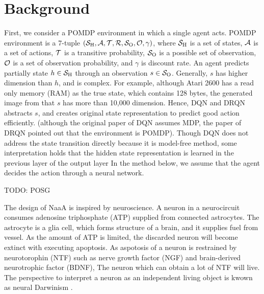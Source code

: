 \section{Background}
First, we consider a POMDP environment in which a single agent acts.
POMDP environment is a 7-tuple $(\S, \A, \Trans, \R, \Observations, \ObProb, \gamma)$,
where $\S$ is a set of states, $\A$ is a set of actions, $\Trans$ is a transitive probability, 
$\Observations$ is a possible set of observation, $\ObProb$ is a set of observation probability, and
$\gamma$ is discount rate.
An agent predicts partially state $h \in \S$ through an observation $s \in \Observations$.
Generally, $s$ has higher dimension than $h$, and is complex.
For example, although Atari 2600 has a read only memory (RAM) as the true state, which contains 128 bytes,
the generated image from that $s$ has more than 10,000 dimension.
Hence, DQN and DRQN abstracts $s$, and creates original state representation to predict good action efficiently.
(although the original paper of DQN assumes MDP, the paper of DRQN pointed out that the environment is POMDP).
Though DQN does not address the state transition directly because it is model-free method, 
some interpretation holds that the hidden state representation is learned in the previous layer of the output layer \citep{zahavy2016graying}
In the method below, we assume that the agent decides the action through a neural network.

TODO: POSG

The design of NaaA is inspired by neuroscience.
A neuron in a neurocircuit consumes adenosine triphosphate (ATP) supplied from connected astrocytes.
The astrocyte is a glia cell, which forms structure of a brain, and it supplies fuel from vessel.
As the amount of ATP is limited, the discarded neuron will become extinct with executing apoptosis.
As aspotosis of a neuron is restrained by neurotorophin (NTF) such as nerve growth factor (NGF) and brain-derived neurotrophic factor (BDNF),
The neuron which can obtain a lot of NTF will live.
The perspective to interpret a neuron as an independent living object is kwown as neural Darwinism \citep{edelman1987neural}.
